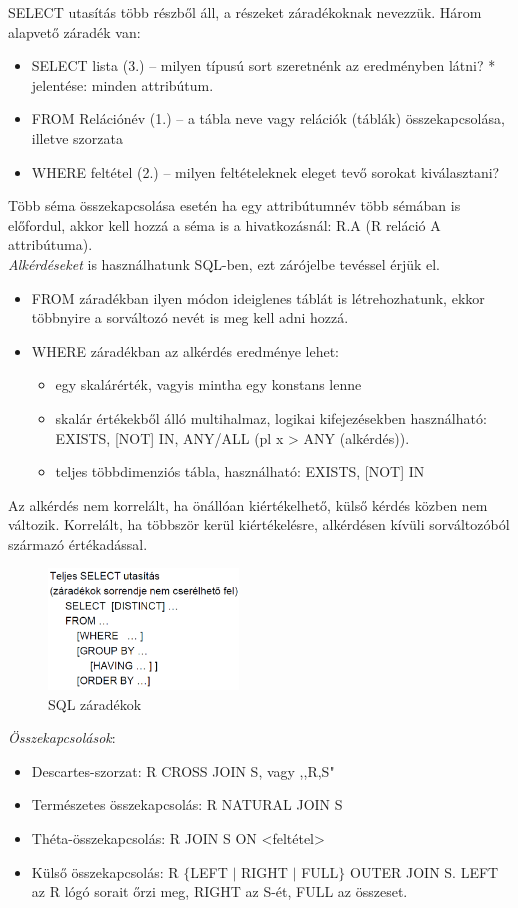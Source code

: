 \documentclass[margin=0px]{article}
\begin{document}
	SELECT utasítás több részből áll, a részeket záradékoknak nevezzük. Három alapvető záradék van:
	\begin{itemize}
		\item SELECT lista (3.) -- milyen típusú sort szeretnénk az eredményben látni? * jelentése: minden attribútum.
		\item FROM Relációnév (1.) -- a tábla neve vagy relációk (táblák) összekapcsolása, illetve szorzata
		\item WHERE feltétel (2.) -- milyen feltételeknek eleget tevő sorokat kiválasztani?
	\end{itemize}
	Több séma összekapcsolása esetén ha egy attribútumnév több sémában is előfordul, akkor kell hozzá a séma is a hivatkozásnál: R.A (R reláció A attribútuma). \\
	\textit{Alkérdéseket} is használhatunk SQL-ben, ezt zárójelbe tevéssel érjük el.\\
	\begin{itemize}
		\item FROM záradékban ilyen módon ideiglenes táblát is létrehozhatunk, ekkor többnyire a sorváltozó nevét is meg kell adni hozzá.
		\item WHERE záradékban az alkérdés eredménye lehet:
		\begin{itemize}
			\item egy skalárérték, vagyis mintha egy konstans lenne
			\item skalár értékekből álló multihalmaz, logikai kifejezésekben használható: EXISTS, [NOT] IN, ANY/ALL (pl x > ANY (alkérdés)).
			\item teljes többdimenziós tábla, használható: EXISTS, [NOT] IN
		\end{itemize}
	\end{itemize}
	Az alkérdés nem korrelált, ha önállóan kiértékelhető, külső kérdés közben nem változik. Korrelált, ha többször kerül kiértékelésre, alkérdésen kívüli sorváltozóból származó értékadással.
	\begin{figure}[H]
		\centering
		\includegraphics[width=0.45\textwidth]{img/sql1.png}
		\caption{SQL záradékok}
	\end{figure}
	\textit{Összekapcsolások}:
	\begin{itemize}
		\item Descartes-szorzat: R CROSS JOIN S, vagy ,,R,S"
		\item Természetes összekapcsolás: R NATURAL JOIN S
		\item Théta-összekapcsolás: R JOIN S ON <feltétel>
		\item Külső összekapcsolás: R $\{$LEFT $|$ RIGHT $|$ FULL$\}$ OUTER JOIN S. LEFT az R lógó sorait őrzi meg, RIGHT az S-ét, FULL az összeset.
	\end{itemize}
	
\end{document}
